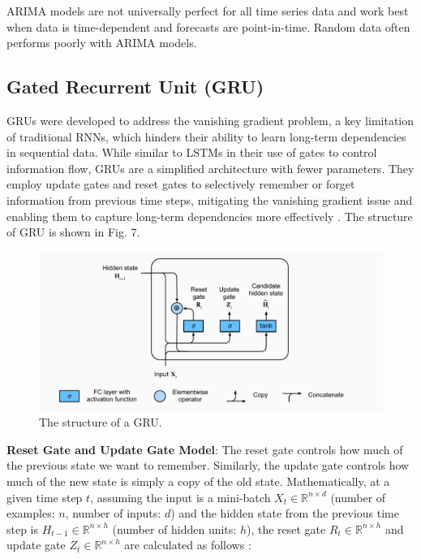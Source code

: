 \documentclass{ieeeojies}
\begin{document}
ARIMA models are not universally perfect for all time series data and work best when data is time-dependent and forecasts are point-in-time. Random data often performs poorly with ARIMA models.
 
\subsection{Gated Recurrent Unit (GRU)}
GRUs were developed to address the vanishing gradient problem, a key limitation of traditional RNNs, which hinders their ability to learn long-term dependencies in sequential data. While similar to LSTMs in their use of gates to control information flow, GRUs are a simplified architecture with fewer parameters. They employ update gates and reset gates to selectively remember or forget information from previous time steps, mitigating the vanishing gradient issue and enabling them to capture long-term dependencies more effectively \cite{b11}. The structure of GRU is shown in Fig. 7. 
\begin{figure}[H]
  \centering
  \begin{minipage}{1\linewidth}
    \centering
    \includegraphics[width=\linewidth]{bibliography/Figure/models/gru_model.png}
    \caption{The structure of a GRU.}
    \label{fig7}
  \end{minipage}
\end{figure}
\textbf{Reset Gate and Update Gate Model}: The reset gate controls how much of the previous state we want to remember. Similarly, the update gate controls how much of the new state is simply a copy of the old state. Mathematically, at a given time step \( t \), assuming the input is a mini-batch \( X_t \in \mathbb{R}^{n \times d} \) (number of examples: \( n \), number of inputs: \( d \)) and the hidden state from the previous time step is \( H_{t-1} \in \mathbb{R}^{n \times h} \) (number of hidden units: \( h \)), the reset gate \( R_t \in \mathbb{R}^{n \times h} \) and update gate \( Z_t \in \mathbb{R}^{n \times h} \) are calculated as follows \cite{b12}:
\end{document}
